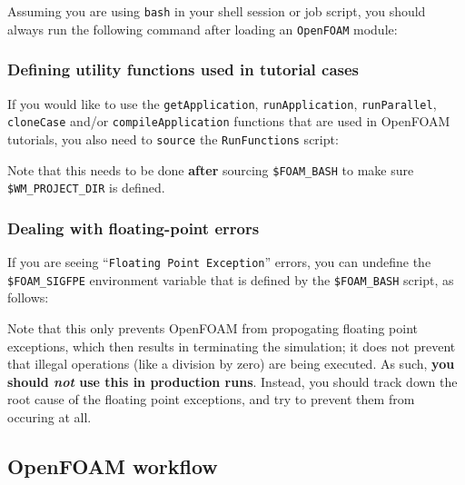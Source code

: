 Assuming you are using \texttt{\small{bash}} in your shell session or job script,
you should always run the following command after loading an \texttt{\small{OpenFOAM}} module:

\begin{prompt}
\end{prompt}


\subsubsection{Defining utility functions used in tutorial cases}

If you would like to use the \texttt{\small{getApplication}}, \texttt{\small{runApplication}},
\texttt{\small{runParallel}}, \texttt{\small{cloneCase}} and/or \texttt{\small{compileApplication}} functions that are
used in OpenFOAM tutorials, you also need to \texttt{\small{source}} the \texttt{\small{RunFunctions}} script:

\begin{prompt}
\end{prompt}

Note that this needs to be done \textbf{after} sourcing \texttt{\small{\$FOAM\_BASH}} to make sure
\texttt{\small{\$WM\_PROJECT\_DIR}} is defined.


\subsubsection{Dealing with floating-point errors}

If you are seeing ``\texttt{\small{Floating Point Exception}}'' errors, you can undefine the
\texttt{\small{\$FOAM\_SIGFPE}} environment variable that is defined by the \texttt{\small{\$FOAM\_BASH}} script,
as follows:

\begin{prompt}
\end{prompt}

Note that this only prevents OpenFOAM from propogating floating point exceptions, which then results in
terminating the simulation; it does not prevent that illegal operations (like a division by zero) are being executed.
As such, \textbf{you should \textit{not} use this in production runs}. Instead, you should track down the root cause
of the floating point exceptions, and try to prevent them from occuring at all.


\subsection{OpenFOAM workflow}


